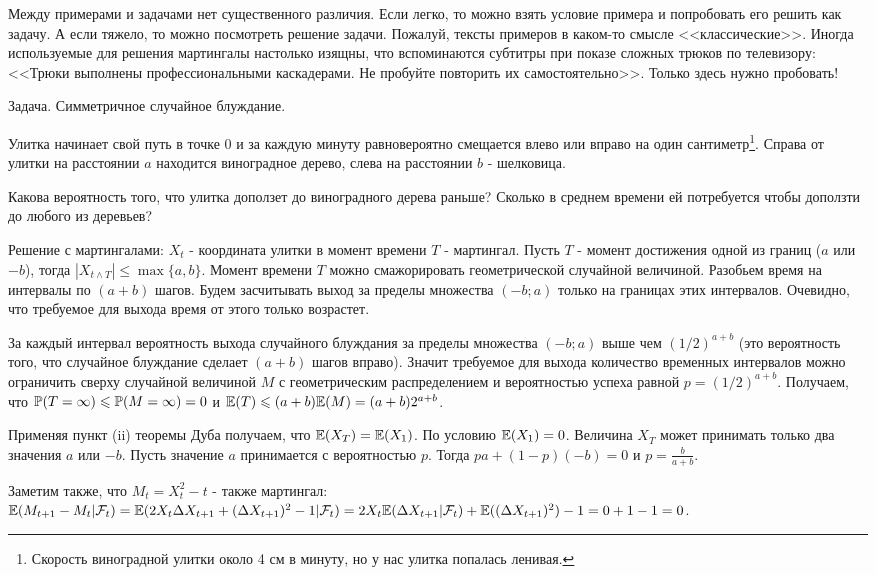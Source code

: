 {Между примерами и задачами нет существенного различия. Если легко, то можно взять условие примера и попробовать его решить как задачу. А если тяжело, то можно посмотреть решение задачи. Пожалуй, тексты примеров в каком-то смысле <<классические>>. Иногда используемые для решения мартингалы настолько изящны, что вспоминаются субтитры при показе сложных трюков по телевизору: <<Трюки выполнены профессиональными каскадерами. Не пробуйте повторить их самостоятельно>>. Только здесь нужно пробовать!



Задача. Симметричное случайное блуждание.

Улитка начинает свой путь в точке 0 и за каждую минуту равновероятно смещается влево или вправо на один сантиметр\footnote{Скорость виноградной улитки около 4 см в минуту, но у нас улитка попалась ленивая.}. Справа от улитки на расстоянии $a$ находится виноградное дерево, слева на расстоянии $b$ - шелковица.

Какова вероятность того, что улитка доползет до виноградного дерева раньше? Сколько в среднем времени ей потребуется чтобы доползти до любого из деревьев?

Решение с мартингалами: $X_{t}$ - координата улитки в момент времени $T$ - мартингал. Пусть $T$ - момент достижения одной из границ ($a$ или $-b$), тогда $|X_{t\wedge T}|\leq \max\{a,b\}$. Момент времени $T$ можно смажорировать геометрической случайной величиной. Разобьем время на интервалы по $(a+b)$ шагов. Будем засчитывать выход за пределы множества $(-b;a)$ только на границах этих интервалов. Очевидно, что требуемое для выхода время от этого только возрастет. 

За каждый интервал вероятность выхода случайного блуждания за пределы множества $(-b;a)$ выше чем $(1/2)^{a+b}$ (это вероятность того, что случайное блуждание сделает $(a+b)$ шагов вправо). Значит требуемое для выхода количество временных интервалов можно ограничить сверху случайной величиной $M$ с геометрическим распределением и вероятностью успеха равной $p=(1/2)^{a+b}$. Получаем, что $\P(T=\infty)\leq \P(M=\infty)=0$ и $\E(T)\leq (a+b) \E(M)=(a+b) 2^{a+b}$.

Применяя пункт (ii) теоремы Дуба получаем, что $\E(X_{T})=\E(X_{1})$. По условию $\E(X_{1})=0$. Величина $X_{T}$ может принимать только два значения $a$ или $-b$. Пусть значение $a$ принимается с вероятностью $p$. Тогда $pa+(1-p)(-b)=0$ и $p=\frac{b}{a+b}$.

Заметим также, что $M_{t}=X^{2}_{t}-t$ - также мартингал: $\E(M_{t+1}-M_{t}|\mathcal{F}_{t})=\E(2X_{t}\Delta X_{t+1}+(\Delta X_{t+1})^{2}-1|\mathcal{F}_{t})=2X_{t}\E(\Delta X_{t+1}|\mathcal{F}_{t})+\E((\Delta X_{t+1})^{2})-1=0+1-1=0$. 

}
